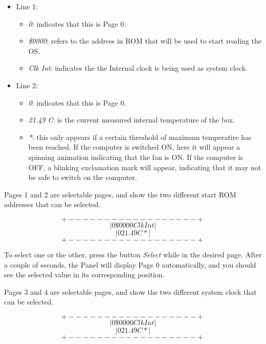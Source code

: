         \begin{itemize}
            \item Line 1:
            \begin{itemize}
                \item \textit{0}: indicates that this is Page 0.
                \item \textit{\$0000}: refers to the address in ROM that will be
                    used to start reading the OS.
                \item \textit{Clk Int}: indicates the the Internal clock is
                    being used as system clock.
            \end{itemize}
            \item Line 2:
            \begin{itemize}
                \item \textit{0}: indicates that this is Page 0.
                \item \textit{21.49 C}: is the current measured internal
                    temperature of the box.
                \item \textit{*}: this only appears if a certain threshold of
                    maximum temperatire has been reached. If the computer is
                    switched ON, here it will appear a spinning animation
                    indicating that the fan is ON. If the computer is OFF, a
                    blinking exclamation mark will appear, indicating that it
                    may not be safe to switch on the computer.
            \end{itemize}
        \end{itemize}

        Pages 1 and 2 are selectable pages, and show the two different start ROM
        addresses that can be selected.

        \[ +------------------+ \]
        \[ |0 \$0000   Clk Int| \]
        \[ |0 21.49 C   *     | \]
        \[ +------------------+ \]
        
        To select one or the other, press the button \textit{Select} while in
        the desired page. After a couple of seconds, the Panel will display Page
        0 automatically, and you should see the selected value in its
        corresponding position.

        Pages 3 and 4 are selectable pages, and show the two different system
        clock that can be selected.

        \[ +------------------+ \]
        \[ |0 \$0000   Clk Int| \]
        \[ |0 21.49 C   *     | \]
        \[ +------------------+ \]
        
